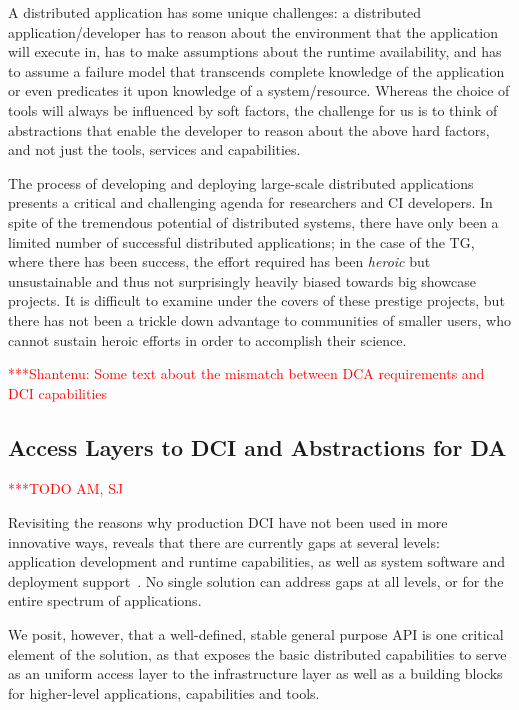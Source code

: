 \documentclass[a4paper,12pt]{article}
\newcommand{\todo}[1]{     {\textcolor{red}  { ***TODO      #1 }}}
\newcommand{\jhanote}[1]{  {\textcolor{red}  { ***Shantenu: #1 }}}
\newcommand{\todo}[1]{}
\newcommand{\jhanote}[1]{}
\begin{document}
 A distributed application has some unique challenges: a distributed
 application/developer has to reason about the environment that the
 application will execute in, has to make assumptions about the
 runtime availability, and has to assume a failure model that
 transcends complete knowledge of the application or even predicates
 it upon knowledge of a system/resource.  Whereas the choice of tools
 will always be influenced by soft factors, the challenge for us is to
 think of abstractions that enable the developer to reason about the
 above hard factors, and not just the tools, services and
 capabilities.

 The process of developing and deploying large-scale distributed
 applications presents a critical and challenging agenda for
 researchers and CI developers.  In spite of the tremendous potential
 of distributed systems, there have only been a limited number of
 successful distributed applications; in the case of the TG, where
 there has been success, the effort required has been {\it heroic} but
 unsustainable and thus not surprisingly heavily biased towards big
 showcase projects. It is difficult to examine under the covers of
 these prestige projects, but there has not been a trickle down
 advantage to communities of smaller users, who cannot sustain heroic
 efforts in order to accomplish their science.


\jhanote{Some text about the mismatch between DCA requirements and
  DCI capabilities}



% 
\subsection{Access Layers to DCI and Abstractions for DA}\todo{AM, SJ}

Revisiting the reasons why production DCI have not been used in more
innovative ways, reveals that there are currently gaps at several
levels: application development and runtime capabilities, as well as
system software and deployment support~\cite{dpagrid2009}.  No single
solution can address gaps at all levels, or for the entire spectrum of
applications.  

We posit, however, that a well-defined, stable general purpose API is
one critical element of the solution, as that exposes the basic
distributed capabilities to serve as an uniform access layer to the
infrastructure layer as well as a building blocks for higher-level
applications, capabilities and tools.
\end{document}
